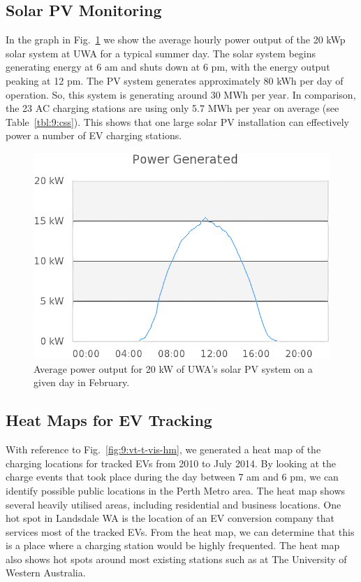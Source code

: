 \subsection{Solar PV Monitoring}
In the graph in Fig.~\ref{fig:9:pv-day} we show the average hourly power output of the 20 kWp solar system at UWA for a typical summer day. The solar system begins generating energy at 6 am and shuts down at 6 pm, with the energy output peaking at 12 pm. The PV system generates approximately 80 kWh per day of operation. So, this system is generating around 30 MWh per year. In comparison, the 23 AC charging stations are using only 5.7 MWh per year on average (see Table~\ref{tbl:9:css}). This shows that one large solar PV installation can effectively power a number of EV charging stations. 

\begin{figure}[H]
	\centering
	\includegraphics[width=0.8\linewidth]{pv_day}
	\caption[Average power output of UWA’s solar PV system]{Average power output for 20 kW of UWA’s solar PV system on a given day in February.}
	\label{fig:9:pv-day}
\end{figure}

\subsection{Heat Maps for EV Tracking}
With reference to Fig.~\ref{fig:9:vt-t-vis-hm}, we generated a heat map of the charging locations for tracked EVs from 2010 to July 2014. By looking at the charge events that took place during the day between 7 am and 6 pm, we can identify possible public locations in the Perth Metro area. The heat map shows several heavily utilised areas, including residential and business locations. One hot spot in Landsdale WA is the location of an EV conversion company that services most of the tracked EVs. From the heat map, we can determine that this is a place where a charging station would be highly frequented. The heat map also shows hot spots around most existing stations such as at The University of Western Australia.


